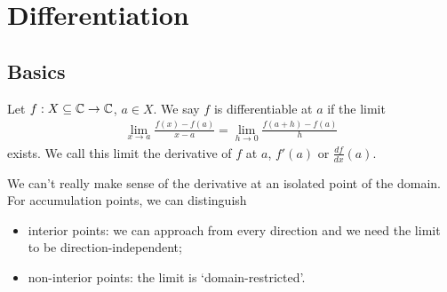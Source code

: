 \documentclass{../../template/note}
\begin{document}
    
    

    \section{Differentiation}

    \subsection{Basics}

    \begin{definition}[Derivative]
        Let \(f: X \subseteq \mathbb C \to \mathbb C\), \(a \in X\). We say \(f\) is differentiable at \(a\) if the limit
        \begin{align*}
            \lim_{x \to a} \frac{f(x)-f(a)}{x-a} = \lim_{h \to 0} \frac{f(a+h)-f(a)}{h}
        \end{align*}
        exists. We call this limit the derivative of \(f\) at \(a\), \(f'(a)\) or \(\frac{df}{dx}(a)\).        
    \end{definition}
    
    \begin{remark*}
        We can't really make sense of the derivative at an isolated point of the domain. For accumulation points, we can distinguish
        \begin{itemize}
            \item interior points: we can approach from every direction and we need the limit to be direction-independent;
            \item non-interior points: the limit is `domain-restricted'.
        \end{itemize}
    \end{remark*}
    
\end{document}

